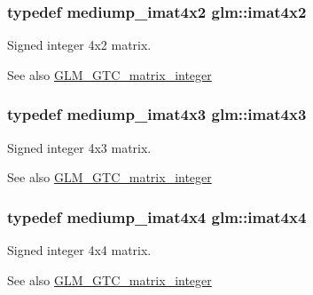 \subsubsection[{imat4x2}]{\setlength{\rightskip}{0pt plus 5cm}typedef mediump\+\_\+imat4x2 {\bf glm\+::imat4x2}}\label{group__gtc__matrix__integer_ga7e733984837e0e7aa9f4aac18f632f63}
Signed integer 4x2 matrix. \begin{DoxySeeAlso}{See also}
\hyperlink{group__gtc__matrix__integer}{G\+L\+M\+\_\+\+G\+T\+C\+\_\+matrix\+\_\+integer} 
\end{DoxySeeAlso}
\hypertarget{group__gtc__matrix__integer_gaa4cca8e80c0603239eda452860063844}{}
\subsubsection[{imat4x3}]{\setlength{\rightskip}{0pt plus 5cm}typedef mediump\+\_\+imat4x3 {\bf glm\+::imat4x3}}\label{group__gtc__matrix__integer_gaa4cca8e80c0603239eda452860063844}
Signed integer 4x3 matrix. \begin{DoxySeeAlso}{See also}
\hyperlink{group__gtc__matrix__integer}{G\+L\+M\+\_\+\+G\+T\+C\+\_\+matrix\+\_\+integer} 
\end{DoxySeeAlso}
\hypertarget{group__gtc__matrix__integer_ga367d8d5281ff82f1215a227dd2ea5ba9}{}
\subsubsection[{imat4x4}]{\setlength{\rightskip}{0pt plus 5cm}typedef mediump\+\_\+imat4x4 {\bf glm\+::imat4x4}}\label{group__gtc__matrix__integer_ga367d8d5281ff82f1215a227dd2ea5ba9}
Signed integer 4x4 matrix. \begin{DoxySeeAlso}{See also}
\hyperlink{group__gtc__matrix__integer}{G\+L\+M\+\_\+\+G\+T\+C\+\_\+matrix\+\_\+integer} 
\end{DoxySeeAlso}
\hypertarget{group__gtc__matrix__integer_ga4840a4d8b9e8997f1173da9e8e5e4de4}{}
